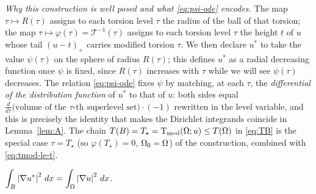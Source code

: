 \emph{Why this construction is well posed and what \eqref{eq:psi-ode}
encodes.} The map $\tau\mapsto R(\tau)$ assigns to each torsion level $\tau$
the radius of the ball of that torsion; the map $\tau\mapsto\varphi(\tau)
=\mathcal T^{-1}(\tau)$ assigns to each torsion level $\tau$ the height $t$
of $u$ whose tail $(u-t)_+$ carries modified torsion $\tau$. We then declare
$u^*$ to take the value $\psi(\tau)$ on the sphere of radius $R(\tau)$; this
defines $u^*$ as a radial decreasing function once $\psi$ is fixed, since
$R(\tau)$ increases with $\tau$ while we will see $\psi(\tau)$ decreases.
The relation \eqref{eq:psi-ode} fixes $\psi$ by matching, at each $\tau$, the
\emph{differential of the distribution function} of $u^*$ to that of $u$:
both sides equal $\frac{d}{d\tau}\bigl(\text{volume of the }\tau\text{-th
superlevel set}\bigr)\cdot(-1)$ rewritten in the level variable, and this is
precisely the identity that makes the Dirichlet integrands coincide in
Lemma~\ref{lem:A}. The chain $T(B)=T_\star=\operatorname{T_{\mathrm{mod}}}(\Omega;u)\le T(\Omega)$ in
\eqref{eq:TB} is the special case $\tau=T_\star$ (so $\varphi(T_\star)=0$,
$\Omega_0=\Omega$) of the construction, combined with \eqref{eq:tmod-le-t}.

\begin{lemma}\label{lem:A}
$\displaystyle\int_B\left|\nabla u^*\right|^2\,dx=\int_\Omega\left|\nabla u\right|^2\,dx$.
\end{lemma}

